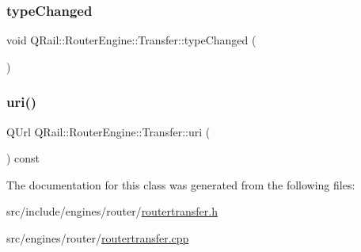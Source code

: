 \mbox{\label{classQRail_1_1RouterEngine_1_1Transfer_a2acb2ce4b06bbc6fae9ebdc8580f36cc}} 
\subsubsection{\texorpdfstring{typeChanged}{typeChanged}}
{\footnotesize\ttfamily void Q\+Rail\+::\+Router\+Engine\+::\+Transfer\+::type\+Changed (\begin{DoxyParamCaption}{ }\end{DoxyParamCaption})\hspace{0.3cm}{\ttfamily [signal]}}

\mbox{\label{classQRail_1_1RouterEngine_1_1Transfer_a395e3c3959c104c17052d4fc783c06eb}} 
\subsubsection{\texorpdfstring{uri()}{uri()}}
{\footnotesize\ttfamily Q\+Url Q\+Rail\+::\+Router\+Engine\+::\+Transfer\+::uri (\begin{DoxyParamCaption}{ }\end{DoxyParamCaption}) const}



The documentation for this class was generated from the following files\+:\begin{DoxyCompactItemize}
\item 
src/include/engines/router/\mbox{\hyperlink{routertransfer_8h}{routertransfer.\+h}}\item 
src/engines/router/\mbox{\hyperlink{routertransfer_8cpp}{routertransfer.\+cpp}}\end{DoxyCompactItemize}
